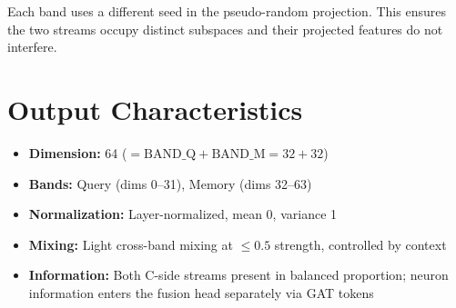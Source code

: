 \documentclass[12pt]{article}
\begin{document}
Each band uses a different seed in the pseudo-random projection.
This ensures the two streams occupy distinct subspaces and their
projected features do not interfere.

\section{Output Characteristics}

\begin{itemize}
\item \textbf{Dimension:} 64 ($= \text{BAND\_Q} + \text{BAND\_M} = 32 + 32$)
\item \textbf{Bands:} Query (dims 0--31), Memory (dims 32--63)
\item \textbf{Normalization:} Layer-normalized, mean 0, variance 1
\item \textbf{Mixing:} Light cross-band mixing at $\leq 0.5$ strength,
controlled by context
\item \textbf{Information:} Both C-side streams present in balanced
proportion; neuron information enters the fusion head separately via
GAT tokens
\end{itemize}
\end{document}
